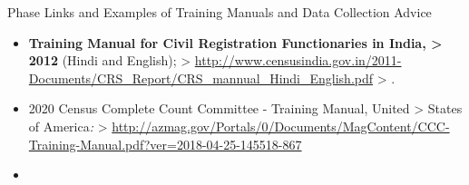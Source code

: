 \documentclass[
]{article}
\begin{document}
Phase Links and Examples of Training Manuals and Data Collection Advice

\begin{itemize}
\item
  \textbf{Training Manual for Civil Registration Functionaries in India,
  \textgreater{} 2012} (Hindi and English);
  \textgreater{} \url{http://www.censusindia.gov.in/2011-Documents/CRS_Report/CRS_mannual_Hindi_English.pdf}
  \textgreater{} .
\item
  2020 Census Complete Count Committee - Training Manual, United
  \textgreater{} States of America\emph{:}
  \textgreater{} \url{http://azmag.gov/Portals/0/Documents/MagContent/CCC-Training-Manual.pdf?ver=2018-04-25-145518-867}
\item ~
  \hypertarget{jips-data-collection-advice.-implementing-data-collection---operational-plan-for-data-collection.-this-document-outlines-an-operational-plan-for-the-data-collection-phase-of-the-household-survey-during-a-profiling-exercise.-this-document-helps-plan-out-how-the-fieldwork-will-actually-be-conducted.-it-includes-the-operational-structure-showing-how-the-implementingdata-collection-partners-fit-in-the-roles-and-responsibilities-for-the-various-actors-involved-and-the-work-plan-for-the-next-steps.-httpsjet.jips.orgphaseimplementing-data-collection-1}{%
}
\end{itemize}
\end{document}
